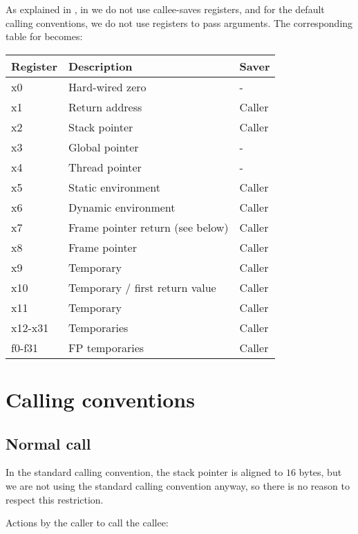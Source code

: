 As explained in , in \sysname{} we
do not use callee-saves registers, and for the default calling
conventions, we do not use registers to pass arguments.  The
corresponding table for \sysname{} becomes:

{\small
\begin{tabular}{|l|l|l|}
  \hline
  Register & Description & Saver\\
  \hline
  \hline
  x0 & Hard-wired zero & -\\
  x1 & Return address & Caller\\
  x2 & Stack pointer & Caller\\
  x3 & Global pointer & -\\
  x4 & Thread pointer & -\\
  x5 & Static environment & Caller\\
  x6 & Dynamic environment & Caller\\
  x7 & Frame pointer return (see below) & Caller\\
  x8 & Frame pointer & Caller\\
  x9 & Temporary & Caller\\
  x10 & Temporary / first return value & Caller\\
  x11 & Temporary & Caller\\
  x12-x31 & Temporaries & Caller\\
  \hline
  f0-f31 & FP temporaries & Caller\\
  \hline
\end{tabular}}

\section{Calling conventions}
\label{sec-backend-risc-v-calling-conventions}

\subsection{Normal call}

In the standard \riscv{} calling convention, the stack pointer is
aligned to $16$ bytes, but we are not using the standard \riscv{}
calling convention anyway, so there is no reason to respect this
restriction.

Actions by the caller to call the callee:

